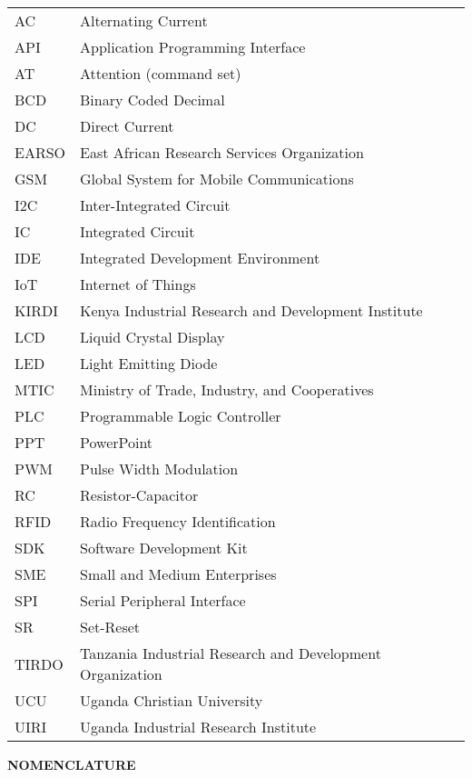 \documentclass[12pt,a4paper]{report}
\begin{document}
\begin{tabular}{ll}
AC & Alternating Current \\
API & Application Programming Interface \\
AT & Attention (command set) \\
BCD & Binary Coded Decimal \\
DC & Direct Current \\
EARSO & East African Research Services Organization \\
GSM & Global System for Mobile Communications \\
I2C & Inter-Integrated Circuit \\
IC & Integrated Circuit \\
IDE & Integrated Development Environment \\
IoT & Internet of Things \\
KIRDI & Kenya Industrial Research and Development Institute \\
LCD & Liquid Crystal Display \\
LED & Light Emitting Diode \\
MTIC & Ministry of Trade, Industry, and Cooperatives \\
PLC & Programmable Logic Controller \\
PPT & PowerPoint \\
PWM & Pulse Width Modulation \\
RC & Resistor-Capacitor \\
RFID & Radio Frequency Identification \\
SDK & Software Development Kit \\
SME & Small and Medium Enterprises \\
SPI & Serial Peripheral Interface \\
SR & Set-Reset \\
TIRDO & Tanzania Industrial Research and Development Organization \\
UCU & Uganda Christian University \\
UIRI & Uganda Industrial Research Institute \\
\end{tabular}

\newpage

{\fontsize{14}{16.8}\selectfont\bfseries\centering NOMENCLATURE\par}
\vspace{10pt}
\end{document}
